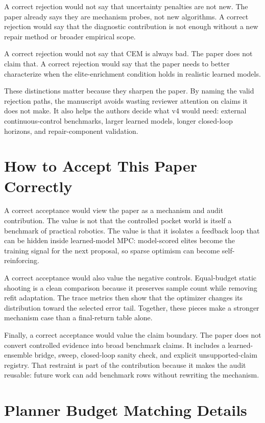 A correct rejection would not say that uncertainty penalties are not new. The
paper already says they are mechanism probes, not new algorithms. A correct
rejection would say that the diagnostic contribution is not enough without a
new repair method or broader empirical scope.

A correct rejection would not say that CEM is always bad. The paper does not
claim that. A correct rejection would say that the paper needs to better
characterize when the elite-enrichment condition holds in realistic learned
models.

These distinctions matter because they sharpen the paper. By naming the valid
rejection paths, the manuscript avoids wasting reviewer attention on claims it
does not make. It also helps the authors decide what v4 would need: external
continuous-control benchmarks, larger learned models, longer closed-loop
horizons, and repair-component validation.

\section{How to Accept This Paper Correctly}
\label{app:accept-correctly}

A correct acceptance would view the paper as a mechanism and audit
contribution. The value is not that the controlled pocket world is itself a
benchmark of practical robotics. The value is that it isolates a feedback loop
that can be hidden inside learned-model MPC: model-scored elites become the
training signal for the next proposal, so sparse optimism can become
self-reinforcing.

A correct acceptance would also value the negative controls. Equal-budget
static shooting is a clean comparison because it preserves sample count while
removing refit adaptation. The trace metrics then show that the optimizer
changes its distribution toward the selected error tail. Together, these
pieces make a stronger mechanism case than a final-return table alone.

Finally, a correct acceptance would value the claim boundary. The paper does
not convert controlled evidence into broad benchmark claims. It includes a
learned-ensemble bridge, sweep, closed-loop sanity check, and explicit
unsupported-claim registry. That restraint is part of the contribution because
it makes the audit reusable: future work can add benchmark rows without
rewriting the mechanism.

\section{Planner Budget Matching Details}
\label{app:budget-matching}


